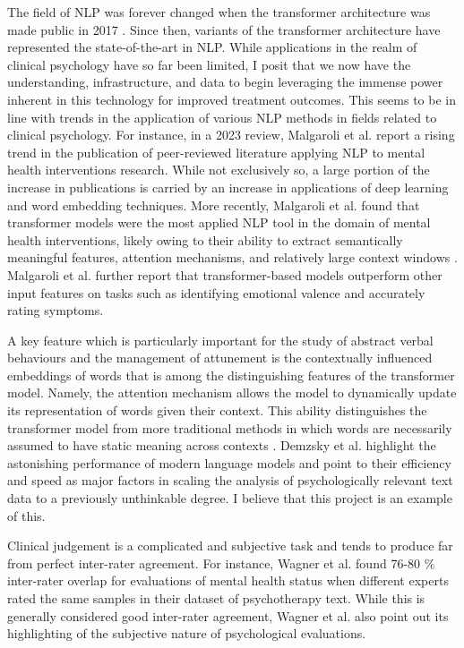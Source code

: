 \documentclass[12pt]{report}
\begin{document}
The field of NLP was forever changed when the transformer architecture was made public in 2017 \cite{Vaswani2017}.
Since then, variants of the transformer architecture have represented the state-of-the-art in NLP.
While applications in the realm of clinical psychology have so far been limited, I posit that we now have the understanding, infrastructure, and data to begin leveraging the immense power inherent in this technology for improved treatment outcomes.
This seems to be in line with trends in the application of various NLP methods in fields related to clinical psychology.
For instance, in a 2023 review, Malgaroli et al. \cite{Malgaroli2023} report a rising trend in the publication of peer-reviewed literature applying NLP to mental health interventions research.
While not exclusively so, a large portion of the increase in publications is carried by an increase in applications of deep learning and word embedding techniques. More recently, Malgaroli et al. found that transformer models were the most applied NLP tool in the domain of mental health interventions, likely owing to their ability to extract semantically meaningful features, attention mechanisms, and relatively large context windows \cite{Malgaroli2023}.
Malgaroli et al. further report that transformer-based models outperform other input features on tasks such as identifying emotional valence and accurately rating symptoms.

A key feature which is particularly important for the study of abstract verbal behaviours and the management of attunement is the contextually influenced embeddings of words that is among the distinguishing features of the transformer model.
Namely, the attention mechanism allows the model to dynamically update its representation of words given their context.
This ability distinguishes the transformer model from more traditional methods in which words are necessarily assumed to have static meaning across contexts \cite{Demszky2023}.
Demzsky et al. \cite{Demszky2023} highlight the astonishing performance of modern language models and point to their efficiency and speed as major factors in scaling the analysis of psychologically relevant text data to a previously unthinkable degree.
I believe that this project is an example of this.

Clinical judgement is a complicated and subjective task and tends to produce far from perfect inter-rater agreement. For instance, Wagner et al. \cite{Wagner2013} found 76-80 \% inter-rater overlap for evaluations of mental health status when different experts rated the same samples in their dataset of psychotherapy text.
While this is generally considered good inter-rater agreement, Wagner et al. also point out its highlighting of the subjective nature of psychological evaluations.
\end{document}
